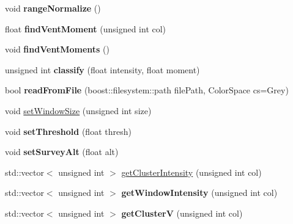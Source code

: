 \begin{DoxyCompactItemize}
\item 
void {\bfseries range\+Normalize} ()\hypertarget{classLaserLoadImage_ad9b7b4f8800f37ff89f986ca4af8a7bf}{}\label{classLaserLoadImage_ad9b7b4f8800f37ff89f986ca4af8a7bf}

\item 
float {\bfseries find\+Vent\+Moment} (unsigned int col)\hypertarget{classLaserLoadImage_a08fde3030797b4f14d8cffa9db54f907}{}\label{classLaserLoadImage_a08fde3030797b4f14d8cffa9db54f907}

\item 
void {\bfseries find\+Vent\+Moments} ()\hypertarget{classLaserLoadImage_a70ba3d146434d777c01767899d66f568}{}\label{classLaserLoadImage_a70ba3d146434d777c01767899d66f568}

\item 
unsigned int {\bfseries classify} (float intensity, float moment)\hypertarget{classLaserLoadImage_ad7e054d5777b2321b61a3cf93367715c}{}\label{classLaserLoadImage_ad7e054d5777b2321b61a3cf93367715c}

\item 
bool {\bfseries read\+From\+File} (boost\+::filesystem\+::path file\+Path, Color\+Space cs=Grey)\hypertarget{classLaserLoadImage_a6178e09e1ccd0722efb3a8ac5bc4d645}{}\label{classLaserLoadImage_a6178e09e1ccd0722efb3a8ac5bc4d645}

\item 
void \hyperlink{classLaserLoadImage_ac8a2c4419ce1ce434ee4326c806d5d15}{set\+Window\+Size} (unsigned int size)
\item 
void {\bfseries set\+Threshold} (float thresh)\hypertarget{classLaserLoadImage_aa38909a755d671d8a84194dcd2265170}{}\label{classLaserLoadImage_aa38909a755d671d8a84194dcd2265170}

\item 
void {\bfseries set\+Survey\+Alt} (float alt)\hypertarget{classLaserLoadImage_a474d701a87924e779cebd0ecf9415745}{}\label{classLaserLoadImage_a474d701a87924e779cebd0ecf9415745}

\item 
std\+::vector$<$ unsigned int $>$ \hyperlink{classLaserLoadImage_a6fab08d0290afb2d0abe8dd6cf7ee591}{get\+Cluster\+Intensity} (unsigned int col)
\item 
std\+::vector$<$ unsigned int $>$ {\bfseries get\+Window\+Intensity} (unsigned int col)\hypertarget{classLaserLoadImage_aed823a660fc4aaf28aa5237abb71384b}{}\label{classLaserLoadImage_aed823a660fc4aaf28aa5237abb71384b}

\item 
std\+::vector$<$ unsigned int $>$ {\bfseries get\+ClusterV} (unsigned int col)\hypertarget{classLaserLoadImage_a5f041db40eacf0aedc64ffa4262f3f92}{}\label{classLaserLoadImage_a5f041db40eacf0aedc64ffa4262f3f92}


\end{DoxyCompactItemize}
